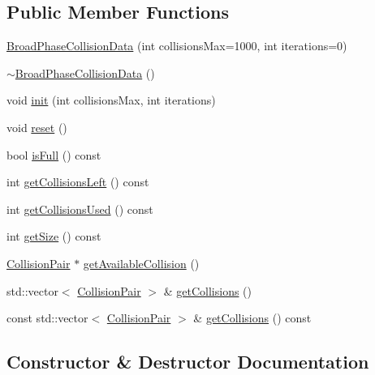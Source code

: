 \subsection*{Public Member Functions}
\begin{DoxyCompactItemize}
\item 
\mbox{\hyperlink{classr3_1_1_broad_phase_collision_data_a435ccad13c2e1d67f1550e11faf7fa3f}{Broad\+Phase\+Collision\+Data}} (int collisions\+Max=1000, int iterations=0)
\item 
\mbox{\hyperlink{classr3_1_1_broad_phase_collision_data_a54a7831ccec5886c70192159bdd62b0c}{$\sim$\+Broad\+Phase\+Collision\+Data}} ()
\item 
void \mbox{\hyperlink{classr3_1_1_broad_phase_collision_data_a6501b0c4ab0f881b6476332aff03d06b}{init}} (int collisions\+Max, int iterations)
\item 
void \mbox{\hyperlink{classr3_1_1_broad_phase_collision_data_a258a014684e0c480929e8980a40a5ab9}{reset}} ()
\item 
bool \mbox{\hyperlink{classr3_1_1_broad_phase_collision_data_a2a553a4971808f372fc4511bdcd8797c}{is\+Full}} () const
\item 
int \mbox{\hyperlink{classr3_1_1_broad_phase_collision_data_a3b063cc09bfac0a6a87fb03dccef16a9}{get\+Collisions\+Left}} () const
\item 
int \mbox{\hyperlink{classr3_1_1_broad_phase_collision_data_acdcf9e658532adf83d51f6cb01d82a16}{get\+Collisions\+Used}} () const
\item 
int \mbox{\hyperlink{classr3_1_1_broad_phase_collision_data_a6ec1a2db157093ffa0fb790dbf82907e}{get\+Size}} () const
\item 
\mbox{\hyperlink{structr3_1_1_collision_pair}{Collision\+Pair}} $\ast$ \mbox{\hyperlink{classr3_1_1_broad_phase_collision_data_a896087f6429507bdd382425c6ffd8ca6}{get\+Available\+Collision}} ()
\item 
std\+::vector$<$ \mbox{\hyperlink{structr3_1_1_collision_pair}{Collision\+Pair}} $>$ \& \mbox{\hyperlink{classr3_1_1_broad_phase_collision_data_a980b5929f5717557bf2b145478a25e86}{get\+Collisions}} ()
\item 
const std\+::vector$<$ \mbox{\hyperlink{structr3_1_1_collision_pair}{Collision\+Pair}} $>$ \& \mbox{\hyperlink{classr3_1_1_broad_phase_collision_data_a2096507a5422a1fb3ba213a2638f9143}{get\+Collisions}} () const
\end{DoxyCompactItemize}


\subsection{Constructor \& Destructor Documentation}
\mbox{\label{classr3_1_1_broad_phase_collision_data_a435ccad13c2e1d67f1550e11faf7fa3f}} 
